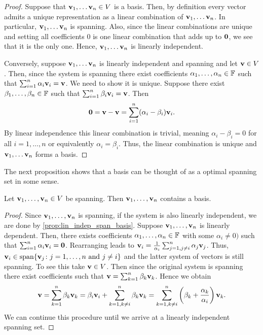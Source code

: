 \documentclass{article}
\begin{document}
\begin{proof}
Suppose that ${\mathbf{v}}_1, \ldots {\mathbf{v}}_n \in V$ is a basis. Then, by definition every vector admits a unique representation as a linear combination of ${\mathbf{v}}_1, \ldots {\mathbf{v}}_n$. In particular, ${\mathbf{v}}_1, \ldots {\mathbf{v}}_n$ is spanning. Also, since the linear combinations are unique and setting all coefficients 0 is one linear combination that adds up to ${\mathbf{0}}$, we see that it is the only one. Hence, ${\mathbf{v}}_1, \ldots {\mathbf{v}}_n$ is linearly independent.

Conversely, suppose ${\mathbf{v}}_1, \ldots {\mathbf{v}}_n$ is linearly independent and spanning and let ${\mathbf{v}}\in V$. Then, since the system is spanning there exist coefficients $\alpha_1,\ldots, \alpha_n\in {\mathbb{F}}$ such that $\sum_{i=1}^n \alpha_i {\mathbf{v}}_i = {\mathbf{v}}$. We need to show it is unique. Suppose there exist $\beta_1,\ldots, \beta_n \in {\mathbb{F}}$ such that $\sum_{i=1}^n \beta_i {\mathbf{v}}_i = {\mathbf{v}}$. Then
\begin{equation*}
    {\mathbf{0}} = {\mathbf{v}} - {\mathbf{v}} = \sum_{i=1}^n (\alpha_i - \beta_i) {\mathbf{v}}_i.
\end{equation*}
By linear independence this linear combination is trivial, meaning $\alpha_i -\beta_i = 0$ for all $i=1,\ldots,n$ or equivalently $\alpha_i =\beta_i$. Thus, the linear combination is unique and ${\mathbf{v}}_1, \ldots {\mathbf{v}}_n$ forms a basis. 
\end{proof}

The next proposition shows that a basis can be thought of as a optimal spanning set in some sense. 

\begin{proposition}\label{prop:span_cont_basis}
 Let ${\mathbf{v}}_1,\ldots, {\mathbf{v}}_n\in V$ be spanning. Then ${\mathbf{v}}_1,\ldots, {\mathbf{v}}_n$ contains a basis.
\end{proposition}

\begin{proof}
Since ${\mathbf{v}}_1,\ldots, {\mathbf{v}}_n$ is spanning, if the system is also linearly independent, we are done by \cref{prop:lin_indep_span_basis}. Suppose ${\mathbf{v}}_1,\ldots, {\mathbf{v}}_n$ is linearly dependent. Then, there exists coefficients $\alpha_1,\ldots,\alpha_n\in {\mathbb{F}}$ with some $\alpha_i\neq 0)$ such that $\sum_{i=1}^n \alpha_i {\mathbf{v}}_i = {\mathbf{0}}$. Rearranging leads to ${\mathbf{v}}_i = \frac{1}{\alpha_i} \sum_{j=1,j\neq i}^n \alpha_j {\mathbf{v}}_j$. Thus, ${\mathbf{v}}_i \in \mathrm{span}\{{\mathbf{v}}_j \colon j=1,\ldots,n \text{ and } j\neq i\}$ and the latter system of vectors is still spanning. To see this take ${\mathbf{v}} \in V$. Then since the original system is spanning there exist coefficients such that ${\mathbf{v}} = \sum_{k= 1}^n \beta_k {\mathbf{v}}_k$. Hence we obtain 
$${\mathbf{v}} = \sum_{k= 1}^n \beta_k {\mathbf{v}}_k = \beta_i {\mathbf{v}}_i + \sum_{k = 1, k\neq i}^n \beta_k {\mathbf{v}}_k = \sum_{k = 1, k\neq i}^n \left(\beta_k +\frac{\alpha_k}{\alpha_i} \right){\mathbf{v}}_k.$$ 
We can continue this procedure until we arrive at a linearly independent spanning set. 
\end{proof}
\end{document}
